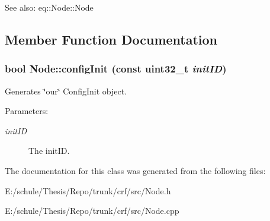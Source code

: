 \begin{Desc}
\item[See also:]eq::Node::Node \end{Desc}


\subsection{Member Function Documentation}
\hypertarget{a00012_ba19d8a715644e09e7c5490ff1932659}{
\subsubsection[{configInit}]{\setlength{\rightskip}{0pt plus 5cm}bool Node::configInit (const uint32\_\-t {\em initID})}}
\label{a00012_ba19d8a715644e09e7c5490ff1932659}


Generates \char`\"{}our\char`\"{} ConfigInit object. 

\begin{Desc}
\item[Parameters:]
\begin{description}
\item[{\em initID}]The initID. \end{description}
\end{Desc}


The documentation for this class was generated from the following files:\begin{CompactItemize}
\item 
E:/schule/Thesis/Repo/trunk/crf/src/Node.h\item 
E:/schule/Thesis/Repo/trunk/crf/src/Node.cpp\end{CompactItemize}
